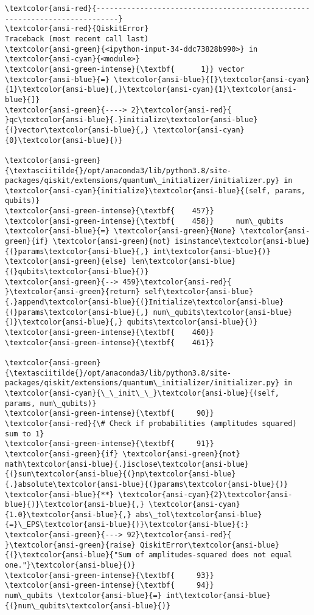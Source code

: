 \documentclass[11pt]{article}
\begin{document}
    \begin{Verbatim}[commandchars=\\\{\}, frame=single, framerule=2mm, rulecolor=\color{outerrorbackground}]
\textcolor{ansi-red}{---------------------------------------------------------------------------}
\textcolor{ansi-red}{QiskitError}                               Traceback (most recent call last)
\textcolor{ansi-green}{<ipython-input-34-ddc73828b990>} in \textcolor{ansi-cyan}{<module>}
\textcolor{ansi-green-intense}{\textbf{      1}} vector \textcolor{ansi-blue}{=} \textcolor{ansi-blue}{[}\textcolor{ansi-cyan}{1}\textcolor{ansi-blue}{,}\textcolor{ansi-cyan}{1}\textcolor{ansi-blue}{]}
\textcolor{ansi-green}{----> 2}\textcolor{ansi-red}{ }qc\textcolor{ansi-blue}{.}initialize\textcolor{ansi-blue}{(}vector\textcolor{ansi-blue}{,} \textcolor{ansi-cyan}{0}\textcolor{ansi-blue}{)}

\textcolor{ansi-green}{\textasciitilde{}/opt/anaconda3/lib/python3.8/site-packages/qiskit/extensions/quantum\_initializer/initializer.py} in \textcolor{ansi-cyan}{initialize}\textcolor{ansi-blue}{(self, params, qubits)}
\textcolor{ansi-green-intense}{\textbf{    457}} 
\textcolor{ansi-green-intense}{\textbf{    458}}     num\_qubits \textcolor{ansi-blue}{=} \textcolor{ansi-green}{None} \textcolor{ansi-green}{if} \textcolor{ansi-green}{not} isinstance\textcolor{ansi-blue}{(}params\textcolor{ansi-blue}{,} int\textcolor{ansi-blue}{)} \textcolor{ansi-green}{else} len\textcolor{ansi-blue}{(}qubits\textcolor{ansi-blue}{)}
\textcolor{ansi-green}{--> 459}\textcolor{ansi-red}{     }\textcolor{ansi-green}{return} self\textcolor{ansi-blue}{.}append\textcolor{ansi-blue}{(}Initialize\textcolor{ansi-blue}{(}params\textcolor{ansi-blue}{,} num\_qubits\textcolor{ansi-blue}{)}\textcolor{ansi-blue}{,} qubits\textcolor{ansi-blue}{)}
\textcolor{ansi-green-intense}{\textbf{    460}} 
\textcolor{ansi-green-intense}{\textbf{    461}} 

\textcolor{ansi-green}{\textasciitilde{}/opt/anaconda3/lib/python3.8/site-packages/qiskit/extensions/quantum\_initializer/initializer.py} in \textcolor{ansi-cyan}{\_\_init\_\_}\textcolor{ansi-blue}{(self, params, num\_qubits)}
\textcolor{ansi-green-intense}{\textbf{     90}}             \textcolor{ansi-red}{\# Check if probabilities (amplitudes squared) sum to 1}
\textcolor{ansi-green-intense}{\textbf{     91}}             \textcolor{ansi-green}{if} \textcolor{ansi-green}{not} math\textcolor{ansi-blue}{.}isclose\textcolor{ansi-blue}{(}sum\textcolor{ansi-blue}{(}np\textcolor{ansi-blue}{.}absolute\textcolor{ansi-blue}{(}params\textcolor{ansi-blue}{)} \textcolor{ansi-blue}{**} \textcolor{ansi-cyan}{2}\textcolor{ansi-blue}{)}\textcolor{ansi-blue}{,} \textcolor{ansi-cyan}{1.0}\textcolor{ansi-blue}{,} abs\_tol\textcolor{ansi-blue}{=}\_EPS\textcolor{ansi-blue}{)}\textcolor{ansi-blue}{:}
\textcolor{ansi-green}{---> 92}\textcolor{ansi-red}{                 }\textcolor{ansi-green}{raise} QiskitError\textcolor{ansi-blue}{(}\textcolor{ansi-blue}{"Sum of amplitudes-squared does not equal one."}\textcolor{ansi-blue}{)}
\textcolor{ansi-green-intense}{\textbf{     93}} 
\textcolor{ansi-green-intense}{\textbf{     94}}             num\_qubits \textcolor{ansi-blue}{=} int\textcolor{ansi-blue}{(}num\_qubits\textcolor{ansi-blue}{)}


\end{Verbatim}
\end{document}

